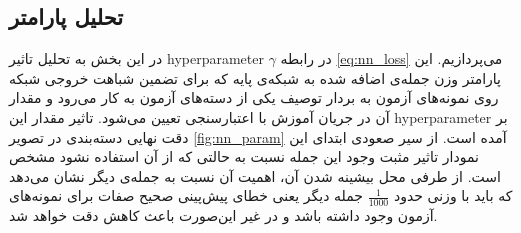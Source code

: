 \subsection{تحلیل پارامتر}\label{exp:nn_params}
در این بخش به تحلیل تاثیر \gls{hyperparameter} $\gamma$ در رابطه \eqref{eq:nn_loss} می‌پردازیم. این پارامتر وزن جمله‌ی اضافه شده به شبکه‌ی پایه که برای تضمین شباهت خروجی شبکه روی نمونه‌های آزمون به بردار توصیف یکی از دسته‌های آزمون به کار می‌رود و مقدار آن  در جریان آموزش با اعتبارسنجی تعیین می‌شود. تاثیر مقدار این \gls{hyperparameter} بر دقت نهایی دسته‌بندی در تصویر
\ref{fig:nn_param}
آمده است. از سیر صعودی ابتدای این نمودار تاثیر مثبت وجود این جمله نسبت به حالتی که از آن استفاده نشود مشخص است. از طرفی محل بیشینه شدن آن، اهمیت آن نسبت به جمله‌ی دیگر نشان می‌دهد که باید با وزنی حدود $\frac{1}{1000}$ جمله دیگر یعنی خطای پیش‌پینی صحیح صفات برای نمونه‌های آزمون وجود داشته باشد و در غیر این‌صورت باعث کاهش دقت خواهد شد.
